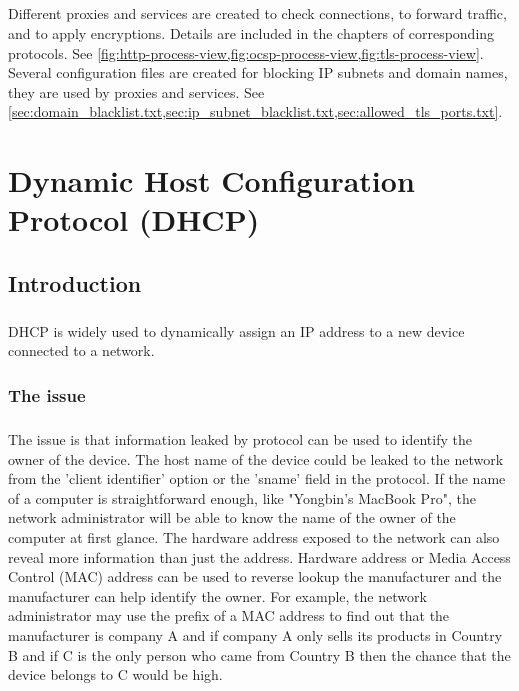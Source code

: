 \documentclass[mscthesis]{usiinfthesis}
\begin{document}
\paragraph{}
Different proxies and services are created to check connections, to forward traffic, and to apply encryptions. Details are included in the chapters of corresponding protocols. See \cref{fig:http-process-view,fig:ocsp-process-view,fig:tls-process-view}. Several configuration files are created for blocking IP subnets and domain names, they are used by proxies and services. See \cref{sec:domain_blacklist.txt,sec:ip_subnet_blacklist.txt,sec:allowed_tls_ports.txt}.

\chapter{Dynamic Host Configuration Protocol (DHCP)}\label{cha:dhcp}

\section{Introduction}
\paragraph{}
DHCP is widely used to dynamically assign an IP address to a new device connected to a network.

\subsection{The issue}
\paragraph{}
The issue is that information leaked by protocol can be used to identify the owner of the device. The host name of the device could be leaked to the network from the 'client identifier' option or the 'sname' field in the protocol.\citep{rfc:dhcp} If the name of a computer is straightforward enough, like "Yongbin's MacBook Pro", the network administrator will be able to know the name of the owner of the computer at first glance. The hardware address exposed to the network can also reveal more information than just the address. Hardware address or Media Access Control (MAC) address can be used to reverse lookup the manufacturer and the manufacturer can help identify the owner.\citep{mac:id} For example, the network administrator may use the prefix of a MAC address to find out that the manufacturer is company A and if company A only sells its products in Country B and if C is the only person who came from Country B then the chance that the device belongs to C would be high.
\end{document}
